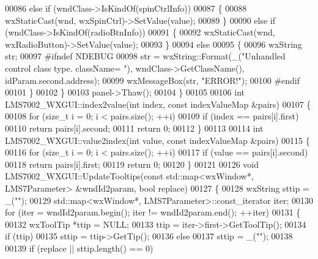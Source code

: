 \begin{DoxyCode}
{{{00086         \textcolor{keywordflow}{else} \textcolor{keywordflow}{if} (wndClass->IsKindOf(spinCtrlInfo))
00087         \{
00088             wxStaticCast(wnd, wxSpinCtrl)->SetValue(value);
00089         \}
00090         \textcolor{keywordflow}{else} \textcolor{keywordflow}{if} (wndClass->IsKindOf(radioBtnInfo))
00091         \{
00092             wxStaticCast(wnd, wxRadioButton)->SetValue(value);
00093         \}
00094         \textcolor{keywordflow}{else}
00095         \{
00096             wxString str;
00097 \textcolor{preprocessor}{#ifndef NDEBUG}
00098             str = wxString::Format(\_(\textcolor{stringliteral}{"Unhandled control class type. className=%
      "}), wndClass->GetClassName(), idParam.second.address);
00099             wxMessageBox(str, \textcolor{stringliteral}{"ERROR!"});
00100 \textcolor{preprocessor}{#endif}
00101         \}
00102     \}
00103     panel->Thaw();
00104 \}
00105 
00106 \textcolor{keywordtype}{int} LMS7002_WXGUI::index2value(\textcolor{keywordtype}{int} index, \textcolor{keyword}{const} indexValueMap &pairs)
00107 \{
00108     \textcolor{keywordflow}{for} (\textcolor{keywordtype}{size\_t} i = 0; i < pairs.size(); ++i)
00109         \textcolor{keywordflow}{if} (index == pairs[i].first)
00110             \textcolor{keywordflow}{return} pairs[i].second;
00111     \textcolor{keywordflow}{return} 0;
00112 \}
00113 
00114 \textcolor{keywordtype}{int} LMS7002_WXGUI::value2index(\textcolor{keywordtype}{int} value, \textcolor{keyword}{const} indexValueMap &pairs)
00115 \{
00116     \textcolor{keywordflow}{for} (\textcolor{keywordtype}{size\_t} i = 0; i < pairs.size(); ++i)
00117         \textcolor{keywordflow}{if} (value == pairs[i].second)
00118             \textcolor{keywordflow}{return} pairs[i].first;
00119     \textcolor{keywordflow}{return} 0;
00120 \}
00121 
00126 \textcolor{keywordtype}{void} LMS7002_WXGUI::UpdateTooltips(\textcolor{keyword}{const} std::map<wxWindow*, LMS7Parameter> &wndId2param, \textcolor{keywordtype}{bool} replace)
00127 \{
00128     wxString sttip = \_(\textcolor{stringliteral}{""});
00129     std::map<wxWindow*, LMS7Parameter>::const\_iterator iter;
00130     \textcolor{keywordflow}{for} (iter = wndId2param.begin(); iter != wndId2param.end(); ++iter)
00131     \{
00132         wxToolTip *ttip = NULL;
00133         ttip = iter->first->GetToolTip();
00134         \textcolor{keywordflow}{if} (ttip)
00135             sttip = ttip->GetTip();
00136         \textcolor{keywordflow}{else}
00137             sttip = \_(\textcolor{stringliteral}{""});
00138 
00139         \textcolor{keywordflow}{if} (replace || sttip.length() == 0)
}}}
\end{DoxyCode}
